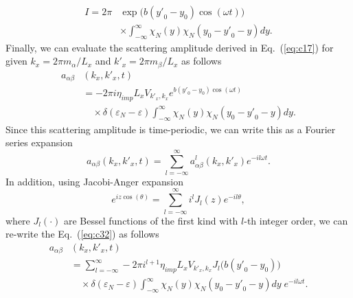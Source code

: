 \documentclass[
 reprint,
 amsmath,amssymb,
 aps,
 prb,
]{revtex4-2}
\begin{document}
\begin{equation} \label{eq:c31}
  \begin{aligned}
    I =
    {2\pi} &
    \exp \bm{(} b({y'}_0 - y_0)\cos(\omega t) \bm{)} \\
    & \times
    \int_{-\infty}^{\infty}
    {\chi}_{N}(y)
    {\chi}_{N}(y_0 - {y'}_0 - y) dy.
  \end{aligned}
\end{equation}
Finally, we can evaluate the scattering amplitude derived in Eq.~(\ref{eq:c17}) for given $k_x = 2\pi m_{\alpha}/L_x$ and $k'_x =  2\pi m_{\beta}/L_x$ as follows
\begin{equation} \label{eq:c32}
  \begin{aligned}
    a_{\alpha\beta}&(k_x,k'_x,t)
    \\
    & =
    -2\pi i
    \eta_{imp} L_x V_{{k'}_x,k_x}
    e^{ b({y'}_0 - y_0)\cos(\omega t)}\\
    & \quad\times
    \delta(\varepsilon_{N} - \varepsilon)
    \int_{-\infty}^{\infty}
    {\chi}_{N}(y)
    {\chi}_{N}(y_0 - {y'}_0 - y) dy.
  \end{aligned}
\end{equation}
Since this scattering amplitude is time-periodic, we can write this as a Fourier series expansion
\begin{equation} \label{eq:c33}
    a_{\alpha\beta}(k_x,k'_x,t) =
    \sum_{l=-\infty}^{\infty} a^l_{\alpha\beta}(k_x,k'_x) e^{-il\omega t}.
\end{equation}
In addition, using Jacobi-Anger expansion \cite{cuyt08,abramowitz64}
\begin{equation} \label{eq:c34}
    e^{iz\cos(\theta)} = \sum_{l=-\infty}^{\infty} i^l J_l(z) e^{-il\theta},
\end{equation}
where $J_l(\cdot)$ are Bessel functions of the first kind with $l$-th integer order, we can re-write the Eq.~(\ref{eq:c32}) as follows
\begin{equation} \label{eq:c35}
  \begin{aligned}
    a_{\alpha\beta}&(k_x,k'_x,t)  \\
    & =
    \sum_{l=-\infty}^{\infty}
    -2\pi i^{l+1}
    \eta_{imp} L_x V_{{k'}_x,k_x}
    J_l\bm{(}b({y'}_0 - y_0)\bm{)} \\
    & \quad\times
    \delta(\varepsilon_{N} - \varepsilon)
    \int_{-\infty}^{\infty}
    {\chi}_{N}(y)
    {\chi}_{N}(y_0 - {y'}_0 - y)  dy \;e^{-il\omega t}.
  \end{aligned}
\end{equation}
\end{document}
